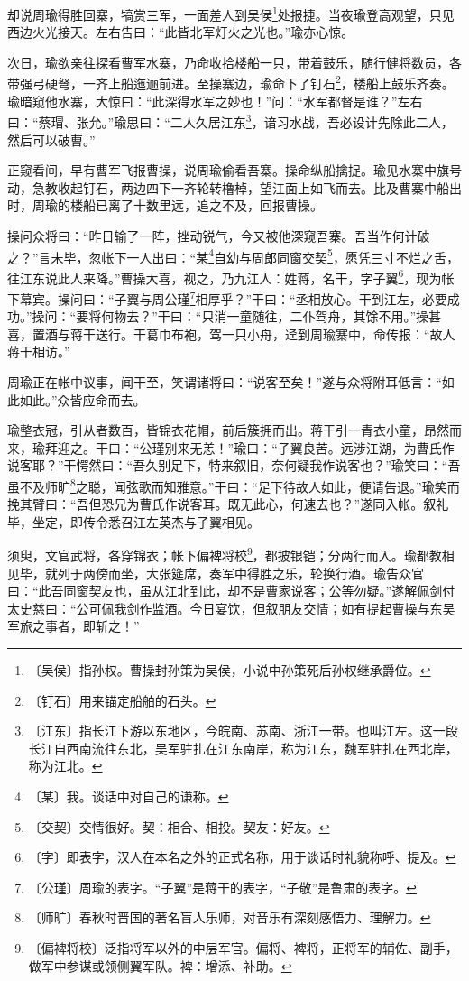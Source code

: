 \documentclass[12pt,UTF-8,openany]{ctexbook}
\begin{document}
\begin{large}
    
    却说周瑜得胜回寨，犒赏三军，一面差人到吴侯\footnote{〔吴侯〕指孙权。曹操封孙策为吴侯，小说中孙策死后孙权继承爵位。}处报捷。当夜瑜登高观望，只见西边火光接天。左右告曰：“此皆北军灯火之光也。”瑜亦心惊。
    
    次日，瑜欲亲往探看曹军水寨，乃命收拾楼船一只，带着鼓乐，随行健将数员，各带强弓硬弩，一齐上船迤逦前进。至操寨边，瑜命下了钉石\footnote{〔钉石〕用来锚定船舶的石头。}，楼船上鼓乐齐奏。瑜暗窥他水寨，大惊曰：“此深得水军之妙也！”问：“水军都督是谁？”左右曰：“蔡瑁、张允。”瑜思曰：“二人久居江东\footnote{〔江东〕指长江下游以东地区，今皖南、苏南、浙江一带。也叫江左。这一段长江自西南流往东北，吴军驻扎在江东南岸，称为江东，魏军驻扎在西北岸，称为江北。}，谙习水战，吾必设计先除此二人，然后可以破曹。”
    
    正窥看间，早有曹军飞报曹操，说周瑜偷看吾寨。操命纵船擒捉。瑜见水寨中旗号动，急教收起钉石，两边四下一齐轮转橹棹，望江面上如飞而去。比及曹寨中船出时，周瑜的楼船已离了十数里远，追之不及，回报曹操。
    
    操问众将曰：“昨日输了一阵，挫动锐气，今又被他深窥吾寨。吾当作何计破之？”言未毕，忽帐下一人出曰：“某\footnote{〔某〕我。谈话中对自己的谦称。}自幼与周郎同窗交契\footnote{〔交契〕交情很好。契：相合、相投。契友：好友。}，愿凭三寸不烂之舌，往江东说此人来降。”曹操大喜，视之，乃九江人：姓蒋，名干，字子翼\footnote{〔字〕即表字，汉人在本名之外的正式名称，用于谈话时礼貌称呼、提及。}，现为帐下幕宾。操问曰：“子翼与周公瑾\footnote{〔公瑾〕周瑜的表字。“子翼”是蒋干的表字，“子敬”是鲁肃的表字。}相厚乎？”干曰：“丞相放心。干到江左，必要成功。”操问：“要将何物去？”干曰：“只消一童随往，二仆驾舟，其馀不用。”操甚喜，置酒与蒋干送行。干葛巾布袍，驾一只小舟，迳到周瑜寨中，命传报：“故人蒋干相访。”
    
    周瑜正在帐中议事，闻干至，笑谓诸将曰：“说客至矣！”遂与众将附耳低言：“如此如此。”众皆应命而去。
    
    瑜整衣冠，引从者数百，皆锦衣花帽，前后簇拥而出。蒋干引一青衣小童，昂然而来，瑜拜迎之。干曰：“公瑾别来无恙！”瑜曰：“子翼良苦。远涉江湖，为曹氏作说客耶？”干愕然曰：“吾久别足下，特来叙旧，奈何疑我作说客也？”瑜笑曰：“吾虽不及师旷\footnote{〔师旷〕春秋时晋国的著名盲人乐师，对音乐有深刻感悟力、理解力。}之聪，闻弦歌而知雅意。”干曰：“足下待故人如此，便请告退。”瑜笑而挽其臂曰：“吾但恐兄为曹氏作说客耳。既无此心，何速去也？”遂同入帐。叙礼毕，坐定，即传令悉召江左英杰与子翼相见。
    
    须臾，文官武将，各穿锦衣；帐下偏裨将校\footnote{〔偏裨将校〕泛指将军以外的中层军官。偏将、裨将，正将军的辅佐、副手，做军中参谋或领侧翼军队。裨：增添、补助。}，都披银铠；分两行而入。瑜都教相见毕，就列于两傍而坐，大张筵席，奏军中得胜之乐，轮换行酒。瑜告众官曰：“此吾同窗契友也，虽从江北到此，却不是曹家说客；公等勿疑。”遂解佩剑付太史慈曰：“公可佩我剑作监酒。今日宴饮，但叙朋友交情；如有提起曹操与东吴军旅之事者，即斩之！”
    

\end{large}
\end{document}
